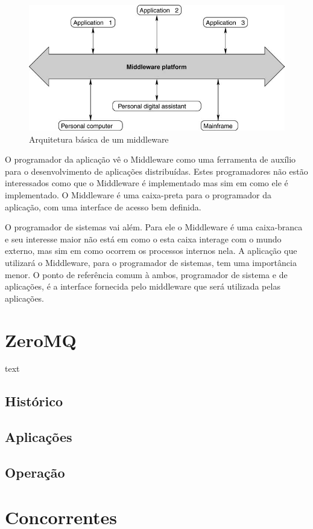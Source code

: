 \documentclass[12pt]{article}
\begin{document}
\begin{figure}[ht]
\centering
\includegraphics[width=.5\textwidth]{Img_Middleware_Arc.png}
\caption{Arquitetura básica de um middleware}
\label{fig:exampleFig1}
\end{figure}

O programador da aplicação vê o Middleware como uma ferramenta de auxílio para o
desenvolvimento de aplicações distribuídas. Estes programadores não estão interessados
como que o Middleware é implementado mas sim em como ele é implementado. O Middleware é
uma caixa-preta para o programador da aplicação, com uma interface de acesso bem definida.

O programador de sistemas vai além. Para ele o Middleware é uma caixa-branca e seu
interesse maior não está em como o esta caixa interage com o mundo externo, mas sim em
como ocorrem os processos internos nela. A aplicação que utilizará o Middleware, para o
programador de sistemas, tem uma importância menor. O ponto de referência comum à ambos,
programador de sistema e de aplicações, é a interface fornecida pelo middleware que será
utilizada pelas aplicações.

\section{ZeroMQ} \label{sec:firstpage}

text

\subsection{Histórico}
\subsection{Aplicações}
\subsection{Operação}

\section{Concorrentes}
\end{document}
